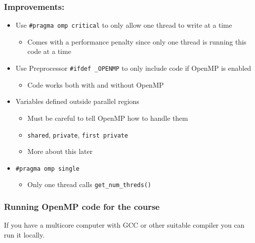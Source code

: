 \subsubsection{Improvements:}\label{improvements}

\begin{itemize}
\itemsep1pt\parskip0pt
\item
  Use \texttt{\#pragma omp critical} to only allow one thread to write
  at a time

  \begin{itemize}
  \itemsep1pt\parskip0pt
  \item
    Comes with a performance penalty since only one thread is running
    this code at a time
  \end{itemize}
\item
  Use Preprocessor \texttt{\#ifdef \_OPENMP} to only include code if
  OpenMP is enabled

  \begin{itemize}
  \itemsep1pt\parskip0pt
  \item
    Code works both with and without OpenMP
  \end{itemize}
\item
  Variables defined outside parallel regions

  \begin{itemize}
  \itemsep1pt\parskip0pt
  \item
    Must be careful to tell OpenMP how to handle them
  \item
    \texttt{shared}, \texttt{private}, \texttt{first private}
  \item
    More about this later
  \end{itemize}
\item
  \texttt{\#pragma omp single}

  \begin{itemize}
  \itemsep1pt\parskip0pt
  \item
    Only one thread calls \texttt{get\_num\_threds()}
  \end{itemize}
\end{itemize}

\subsubsection{Running OpenMP code for the
course}\label{running-openmp-code-for-the-course}

If you have a multicore computer with GCC or other suitable compiler you
can run it locally.

